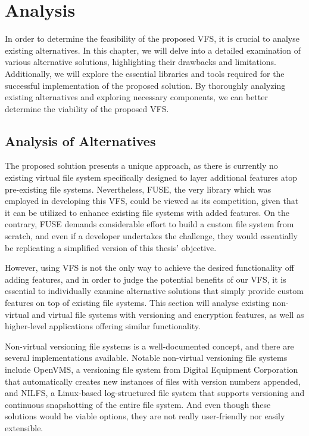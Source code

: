 \chapter{Analysis}
\label{chap:analysis}

In order to determine the feasibility of the proposed VFS, it is crucial to analyse existing alternatives.
In this chapter, we will delve into a detailed examination of various alternative solutions, highlighting their drawbacks and limitations.
Additionally, we will explore the essential libraries and tools required for the successful implementation of the proposed solution.
By thoroughly analyzing existing alternatives and exploring necessary components, we can better determine the viability of the proposed VFS\@.


\section{Analysis of Alternatives}\label{sec:alternatives}

The proposed solution presents a unique approach, as there is currently no existing virtual file system specifically designed to layer additional features atop pre-existing file systems.
Nevertheless, FUSE, the very library which was employed in developing this VFS, could be viewed as its competition, given that it can be utilized to enhance existing file systems with added features.
On the contrary, FUSE demands considerable effort to build a custom file system from scratch, and even if a developer undertakes the challenge, they would essentially be replicating a simplified version of this thesis' objective.

However, using VFS is not the only way to achieve the desired functionality off adding features, and in order to judge the potential benefits of our VFS, it is essential to individually examine alternative solutions that simply provide custom features on top of existing file systems.
This section will analyse existing non-virtual and virtual file systems with versioning and encryption features, as well as higher-level applications offering similar functionality.

Non-virtual versioning file systems is a well-documented concept, and there are several implementations available.
Notable non-virtual versioning file systems include OpenVMS, a versioning file system from Digital Equipment Corporation that automatically creates new instances of files with version numbers appended, and NILFS, a Linux-based log-structured file system that supports versioning and continuous snapshotting of the entire file system.
And even though these solutions would be viable options, they are not really user-friendly nor easily extensible.

